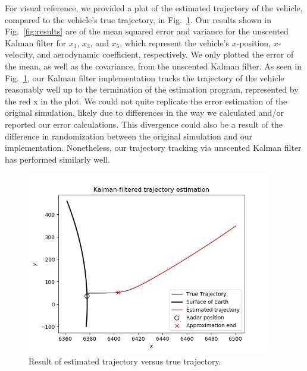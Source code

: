 \documentclass[]{article}
\begin{document}
 For visual reference, we provided a plot of the estimated trajectory of the vehicle, compared to the vehicle's true trajectory, in Fig.~\ref{fig:est_trajectory}. Our results shown in Fig.~\ref{fig:results} are of the mean squared error and variance for the unscented Kalman filter for $x_{1}$, $x_{3}$, and $x_{5}$, which represent the vehicle's $x$-position, $x$-velocity, and aerodynamic coefficient, respectively. We only plotted the error of the mean, as well as the covariance, from the unscented Kalman filter. As seen in Fig.~\ref{fig:est_trajectory}, our Kalman filter implementation tracks the trajectory of the vehicle reasonably well up to the termination of the estimation program, represented by the red \color{red}x \color{black} in the plot. We could not quite replicate the error estimation of the original simulation, likely due to differences in the way we calculated and/or reported our error calculations. This divergence could also be a result of the difference in randomization between the original simulation and our implementation. Nonetheless, our trajectory tracking via unscented Kalman filter has performed similarly well.

\begin{figure}[htb]
\centering\noindent
\includegraphics[width=0.95\textwidth]{Estimated_Trajectory.png}
\caption{Result of estimated trajectory versus true trajectory.}
\label{fig:est_trajectory}
\end{figure}
\end{document}
